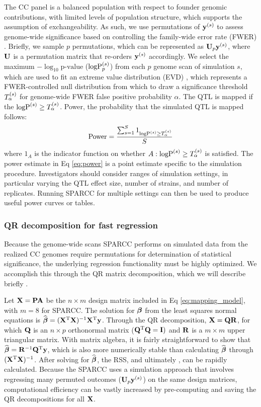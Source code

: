 The CC panel is a balanced population with respect to founder genomic contributions, with limited levels of population structure, which supports the assumption of exchangeability. As such, we use permutations of $\mathbf{y}^{(s)}$ to assess genome-wide significance based on controlling the family-wide error rate (FWER) \citep{Doerge1996}. Briefly, we sample $p$ permutations, which can be represented as $\mathbf{U}_{p}\mathbf{y}^{(s)}$, where $\mathbf{U}$ is a permutation matrix that re-orders $\mathbf{y}^{(s)}$ accordingly. We select the maximum $-\log_{10}\text{p-value}$ ($\text{logP}^{(s)}_{p}$) from each $p$ genome scan of simulation $s$, which are used to fit an extreme value distribution (EVD) \citep{Dudbridge2004,Valdar2006c}, which represents a FWER-controlled null distribution from which to draw a significance threshold $T^{(s)}_{\alpha}$ for genome-wide FWER false positive probability $\alpha$. The QTL is mapped if the $\text{logP}^{(s)} \ge T^{(s)}_{\alpha}$. Power, the probability that the simulated QTL is mapped follows:
\begin{equation}
	\text{Power} = \frac{\sum_{s=1}^{S} 1_{\text{logP}^{(s)} \ge T^{(s)}_{\alpha}}}{S}
    \label{eq:power}
\end{equation}
where $1_{A}$ is the indicator function on whether $A: \text{logP}^{(s)} \ge T^{(s)}_{\alpha}$ is satisfied. The power estimate in Eq \ref{eq:power} is a point estimate specific to the simulation procedure. Investigators should consider ranges of simulation settings, in particular varying the QTL effect size, number of strains, and number of replicates. Running SPARCC for multiple settings can then be used to produce useful power curves or tables.

\subsubsection{QR decomposition for fast regression}

Because the genome-wide scans SPARCC performs on simulated data from the realized CC genomes require permutations for determination of statistical significance, the underlying regression functionality must be highly optimized. We accomplish this through the QR matrix decomposition, which we will describe briefly \citep{Venables2002}. 

Let $\mathbf{X}=\mathbf{P}\mathbf{A}$ be the $n \times m$ design matrix included in Eq \ref{eq:mapping_model}, with $m=8$ for SPARCC. The solution for $\boldsymbol{\beta}$ from the least squares normal equations is $\widehat{\boldsymbol{\beta}} = (\mathbf{X}^{\text{T}}\mathbf{X})^{-1}\mathbf{X}^{\text{T}}\mathbf{y}$. Through the QR decomposition, $\mathbf{X} = \mathbf{Q}\mathbf{R}$, for which $\mathbf{Q}$ is an $n \times p$ orthonormal matrix  ($\mathbf{Q}^{\text{T}}\mathbf{Q} = \mathbf{I})$ and $\mathbf{R}$ is a $m \times m$ upper triangular matrix. With matrix algebra, it is fairly straightforward to show that $\widehat{\boldsymbol{\beta}} = \mathbf{R}^{-1}\mathbf{Q}^{\text{T}}\mathbf{y}$, which is also more numerically stable than calculating $\widehat{\boldsymbol{\beta}}$ through $(\mathbf{X}^{\text{T}}\mathbf{X})^{-1}$. After solving for $\widehat{\boldsymbol{\beta}}$, the RSS, and ultimately \logp, can be rapidly calculated. Because the SPARCC uses a simulation approach that involves regressing many permuted outcomes ($\mathbf{U}_{p}\mathbf{y}^{(s)}$) on the same design matrices, computational efficiency can be vastly increased by pre-computing and saving the QR decompositions for all $\mathbf{X}$.

